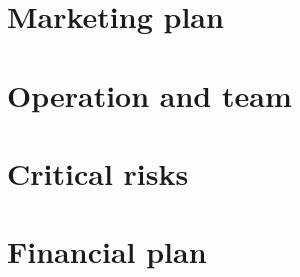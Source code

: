 \documentclass[12pt,a4paper,oneside]{book}
\begin{document}
\chapter{Marketing plan}

\chapter{Operation and team}

\chapter{Critical risks}

\chapter{Financial plan}



%

\end{document}
